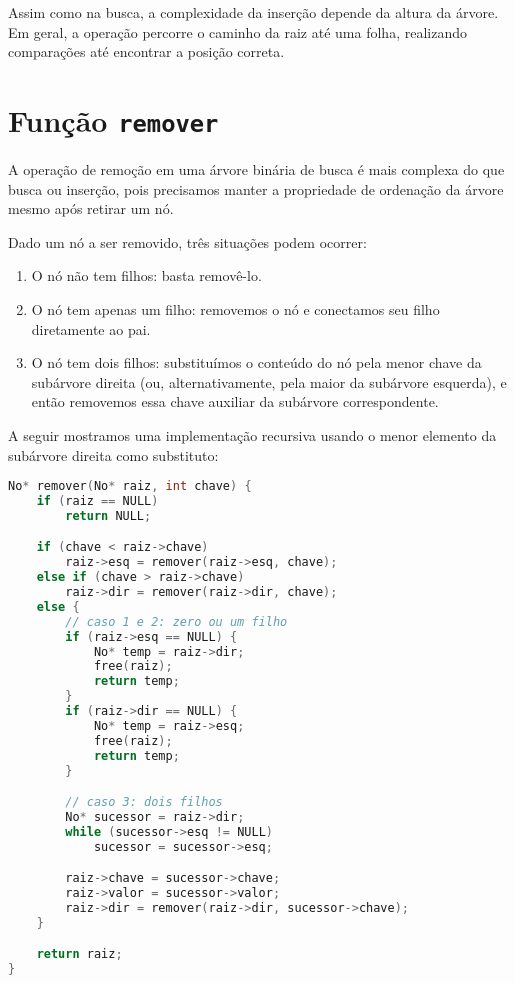 Assim como na busca, a complexidade da inserção depende da altura da árvore. 
Em geral, a operação percorre o caminho da raiz até uma folha, realizando comparações até encontrar a posição correta.

\section{Função \texttt{remover}}

A operação de remoção em uma árvore binária de busca é mais complexa do que busca ou inserção, pois precisamos manter a propriedade de ordenação da árvore mesmo após retirar um nó.

Dado um nó a ser removido, três situações podem ocorrer:

\begin{enumerate}
  \item O nó não tem filhos: basta removê-lo.
  \item O nó tem apenas um filho: removemos o nó e conectamos seu filho diretamente ao pai.
  \item O nó tem dois filhos: substituímos o conteúdo do nó pela menor chave da subárvore direita (ou, alternativamente, pela maior da subárvore esquerda), e então removemos essa chave auxiliar da subárvore correspondente.
\end{enumerate}

A seguir mostramos uma implementação recursiva usando o menor elemento da subárvore direita como substituto:

\begin{lstlisting}[language=C, caption={Remoção recursiva em ABB}]
No* remover(No* raiz, int chave) {
    if (raiz == NULL)
        return NULL;

    if (chave < raiz->chave)
        raiz->esq = remover(raiz->esq, chave);
    else if (chave > raiz->chave)
        raiz->dir = remover(raiz->dir, chave);
    else {
        // caso 1 e 2: zero ou um filho
        if (raiz->esq == NULL) {
            No* temp = raiz->dir;
            free(raiz);
            return temp;
        }
        if (raiz->dir == NULL) {
            No* temp = raiz->esq;
            free(raiz);
            return temp;
        }

        // caso 3: dois filhos
        No* sucessor = raiz->dir;
        while (sucessor->esq != NULL)
            sucessor = sucessor->esq;

        raiz->chave = sucessor->chave;
        raiz->valor = sucessor->valor;
        raiz->dir = remover(raiz->dir, sucessor->chave);
    }

    return raiz;
}
\end{lstlisting}

